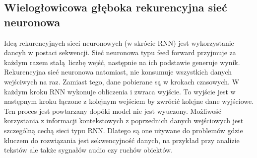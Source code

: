 \subsection{Wielogłowicowa głęboka rekurencyjna sieć neuronowa}
Ideą rekurencyjnych sieci neuronowych (w skrócie RNN) jest wykorzystanie dancyh w postaci sekwencji. 
Sieć neuronowa typu feed forward przyjmuje za każdym razem stałą liczbę wejść, następnie na ich podstawie generuje wynik. 
Rekurencyjna sieć neuronowa natomiast, nie konsumuje wszystkich danych wejściwych na raz. Zamiast tego,
dane pobierane są w krokach czasowych. W każdym kroku RNN wykonuje obliczenia i zwraca wyjście. 
To wyjście jest w następnym kroku łączone z kolejnym wejściem by zwrócić kolejne dane wyjściowe. 
Ten proces jest powtarzany dopóki model nie jest wyuczony. Możliwość korzystania z 
informacji kontekstowych z poprzednich danych wejściowych jest szczególną cechą sieci typu RNN. Dlatego
są one używane do problemów gdzie kluczem do rozwiązania jest sekwencyjność danych, na przykład
przy analizie tekstów ale także sygnałów audio czy ruchów obiektów.

